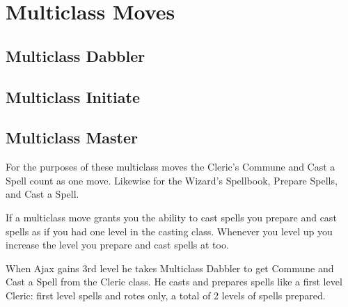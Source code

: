 \chapter{Multiclass Moves}
   
 
\section{Multiclass Dabbler}    
 
\section{Multiclass Initiate}    
 
\section{Multiclass Master}    
 

For the purposes of these multiclass moves the Cleric's Commune and Cast a Spell count as one move. Likewise for the Wizard's Spellbook, Prepare Spells, and Cast a Spell.

 

If a multiclass move grants you the ability to cast spells you prepare and cast spells as if you had one level in the casting class. Whenever you level up you increase the level you prepare and cast spells at too.

 
\startExample
When Ajax gains 3rd level he takes Multiclass Dabbler to get Commune and Cast a Spell from the Cleric class. He casts and prepares spells like a first level Cleric: first level spells and rotes only, a total of 2 levels of spells prepared.
\stopExample
 
